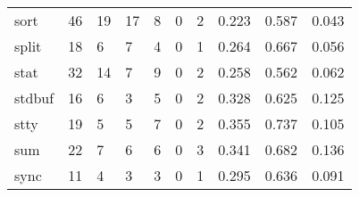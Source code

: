 \begin{longtable}{lp{1.3cm}p{1.3cm}p{1.3cm}p{1.3cm}p{1.3cm}p{1.3cm}p{1.3cm}p{1.3cm}p{1.3cm}}
sort      &                     46 &                                            19 &                                           17 &                                           8 &                                            0 &                                          2 &                                0.223 &                                  0.587 &                                0.043 \\
split     &                     18 &                                             6 &                                            7 &                                           4 &                                            0 &                                          1 &                                0.264 &                                  0.667 &                                0.056 \\
stat      &                     32 &                                            14 &                                            7 &                                           9 &                                            0 &                                          2 &                                0.258 &                                  0.562 &                                0.062 \\
stdbuf    &                     16 &                                             6 &                                            3 &                                           5 &                                            0 &                                          2 &                                0.328 &                                  0.625 &                                0.125 \\
stty      &                     19 &                                             5 &                                            5 &                                           7 &                                            0 &                                          2 &                                0.355 &                                  0.737 &                                0.105 \\
sum       &                     22 &                                             7 &                                            6 &                                           6 &                                            0 &                                          3 &                                0.341 &                                  0.682 &                                0.136 \\
sync      &                     11 &                                             4 &                                            3 &                                           3 &                                            0 &                                          1 &                                0.295 &                                  0.636 &                                0.091 \\

\end{longtable}
